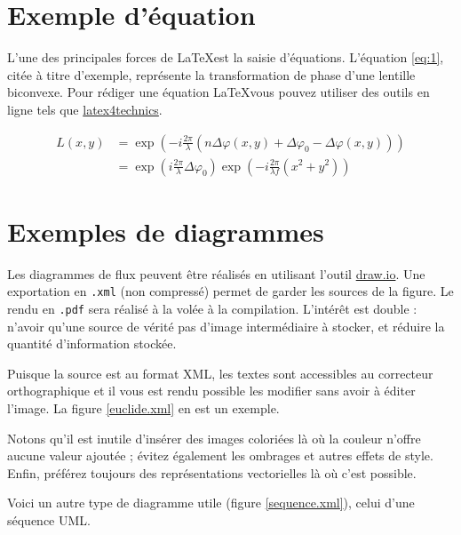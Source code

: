 \documentclass[
    iai, %
    eai, %
]{heig-tb}
\begin{document}
\section{Exemple d'équation}
L'une des principales forces de \LaTeX est la saisie d'équations. L'équation \ref{eq:1}, citée à titre d'exemple, représente la transformation de phase d'une lentille biconvexe. Pour rédiger une équation \LaTeX vous pouvez utiliser des outils en ligne tels que \href{https://www.latex4technics.com/}{latex4technics}.

\begin{equation} \label{eq:1}
  \begin{split}
    L(x,y) &= \exp\left( - i\frac{{2\pi }}{\lambda }\left( {n\Delta \varphi (x,y) + \Delta {\varphi _0} - \Delta \varphi (x,y)} \right)\right)\\
    &= {\exp\left({i\frac{{2\pi }}{\lambda }\Delta {\varphi _0}}\right)}{\exp\left({ - i\frac{{2\pi }}{{\lambda f}}({x^2} + {y^2})}\right)}
  \end{split}
\end{equation}

\section{Exemples de diagrammes}

Les diagrammes de flux peuvent être réalisés en utilisant l'outil \href{https://app.diagrams.net/}{draw.io}. Une exportation en \texttt{.xml} (non compressé) permet de garder les sources de la figure. Le rendu en \texttt{.pdf} sera réalisé à la volée à la compilation. L'intérêt est double : n'avoir qu'une source de vérité \cad pas d'image intermédiaire à stocker, et réduire la quantité d'information stockée.

Puisque la source est au format XML, les textes sont accessibles au correcteur orthographique et il vous est rendu possible les modifier sans avoir à éditer l'image. La figure \ref{euclide.xml} en est un exemple.



Notons qu'il est inutile d'insérer des images coloriées là où la couleur n'offre aucune valeur ajoutée ; évitez également les ombrages et autres effets de style. Enfin, préférez toujours des représentations vectorielles là où c'est possible.

Voici un autre type de diagramme utile (figure \ref{sequence.xml}), celui d'une séquence UML.

\end{document}
